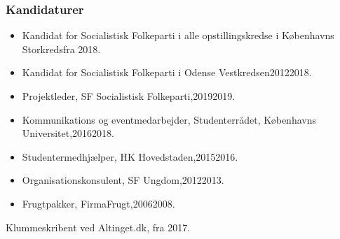 \documentclass[11pt, a4paper]{awesome-cv}
\begin{document}
\begin{cvletter}
\subsubsection*{Kandidaturer}
\begin{itemize}
\item Kandidat for Socialistisk Folkeparti i alle opstillingskredse i Københavns Storkredsfra 2018.
\item Kandidat for Socialistisk Folkeparti i Odense Vestkredsen20122018.
\end{itemize}
\begin{itemize}
\item Projektleder, SF  Socialistisk Folkeparti,20192019.
\item Kommunikations og eventmedarbejder, Studenterrådet, Københavns Universitet,20162018.
\item Studentermedhjælper, HK Hovedstaden,20152016.
\item Organisationskonsulent, SF Ungdom,20122013.
\item Frugtpakker, FirmaFrugt,20062008.
\end{itemize}
Klummeskribent ved Altinget.dk, fra 2017.

\end{cvletter}
\end{document}
